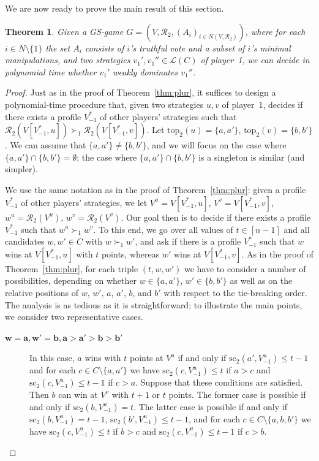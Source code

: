 \documentclass[11pt]{article}
\newtheorem{theorem}{Theorem}%
\newcommand{\calR}{\mathcal{R}}
\newcommand{\calL}{\mathcal{L}}
\newcommand{\tp}{\mathrm{top}}
\newcommand{\scr}{\mathrm{sc}}
\begin{document}
We are now ready to prove the main result of this section.

\begin{theorem}\label{thm:2-app}
Given a GS-game $G=(V, \calR_2, (A_i)_{i\in N(V, \calR_2)})$,
where for each $i\in N\setminus\{1\}$ the set $A_i$ consists of $i$'s truthful vote
and a subset of $i$'s minimal manipulations,
and two strategies $v_1', v_1''\in\calL(C)$ of player~1, 
we can decide in polynomial time whether $v_1'$ weakly dominates $v_1''$.
\end{theorem}

\begin{proof}
Just as in the proof of Theorem~\ref{thm:plur}, it suffices to design a polynomial-time procedure that, 
given two strategies $u, v$ of player~1, decides if there exists a profile $V^*_{-1}$
of other players' strategies such that $\calR_2(V[V^*_{-1}, u])\succ_1 \calR_2(V[V^*_{-1}, v])$.
Let $\tp_2(u)=\{a, a'\}$, $\tp_2(v) = \{b, b'\}$. We can assume that $\{a, a'\}\neq \{b, b'\}$, 
and we will focus on the case where $\{a, a'\}\cap \{b, b'\}=\emptyset$; the case 
where $\{a, a'\}\cap \{b, b'\}$ is a singleton is similar (and simpler).

We use the same notation as in the proof of Theorem~\ref{thm:plur}:
given a profile $V^*_{-1}$ of other players' strategies, 
we let $V^u=V[V^*_{-1}, u]$, $V^v=V[V^*_{-1}, v]$, $w^u=\calR_2(V^u)$, $w^v=\calR_2(V^v)$.
Our goal then is to decide if there exists a profile $V^*_{-1}$ such that $w^u\succ_1 w^v$.
To this end, we go over all values of $t\in[n-1]$ and all candidates $w, w'\in C$
with $w\succ_1 w'$, and ask if there is a profile $V^*_{-1}$
such that $w$ wins at $V[V^*_{-1}, u]$ with $t$ points, 
whereas $w'$ wins at $V[V^*_{-1}, v]$. As in the proof of Theorem~\ref{thm:plur}, 
for each triple $(t, w, w')$ 
we have to consider a number of possibilities, depending on whether $w\in\{a, a'\}$, 
$w'\in\{b, b'\}$ as well as on the relative positions of $w$, $w'$, $a$, $a'$, $b$, and $b'$
with respect to the tie-breaking order. The analysis is as tedious as it is straightforward;
to illustrate the main points, we consider two representative cases. 

\begin{description}
\item[$\boldsymbol{w=a, w'=b, a>a'>b>b'}$\ \ ] 
In this case,  $a$ wins with $t$ points at $V^u$ 
if and only if $\scr_2(a', V^u_{-1})\le t-1$ and for each $c\in C\setminus\{a, a'\}$ we have
$\scr_2(c, V^u_{-1})\le t$ if $a>c$ and $\scr_2(c, V^u_{-1})\le t-1$ if $c>a$.
Suppose that these conditions are satisfied.
Then $b$ can win at $V^v$ with $t+1$ or $t$ points. The former case is possible
if and only if $\scr_2(b, V^u_{-1})= t$. 
The latter case is possible
if and only if $\scr_2(b, V^u_{-1})= t-1$, $\scr_2(b', V^u_{-1})\le t-1$, 
and for each $c\in C\setminus\{a, b, b'\}$ we have
$\scr_2(c, V^u_{-1})\le t$ if $b>c$ and $\scr_2(c, V^u_{-1})\le t-1$ if $c>b$.


\end{description}
\end{proof}
\end{document}
